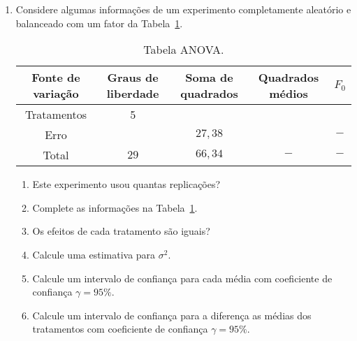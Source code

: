 \documentclass[11pt, a4paper]{article}
\begin{document}
\begin{enumerate}
	\item Considere algumas informações de um experimento completamente aleatório e balanceado com um fator da Tabela~\ref{tab:anova-exe3}.
	\begin{table}[htbp]
		\centering
		\begin{tabular}{c|c|c|c|c}
			\toprule[0.05cm]
			Fonte de variação & Graus de liberdade & Soma de quadrados & Quadrados médios & $F_0$ \\ \midrule[0.025cm]
			Tratamentos & 5 & && \\ \midrule[0.025cm]
			Erro & & $27,38$ && $-$ \\ \midrule[0.025cm]
			Total & $29$ & $66,34$ & $-$ & $-$\\
			\bottomrule[0.05cm]			
		\end{tabular}
		\caption{Tabela ANOVA.}
		\label{tab:anova-exe3}
	\end{table}
	\begin{enumerate}
		\item Este experimento usou quantas replicações?
		\item Complete as informações na Tabela~\ref{tab:anova-exe3}.
		\item Os efeitos de cada tratamento são iguais?
		\item Calcule uma estimativa para $\sigma^2$.
		\item Calcule um intervalo de confiança para cada média com coeficiente de confiança $\gamma=95\%$.
		\item Calcule um intervalo de confiança para a diferença as médias dos tratamentos com coeficiente de confiança $\gamma=95\%$.
	\end{enumerate}


\end{enumerate}
\end{document}
